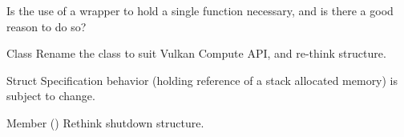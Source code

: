 \begin{DoxyRefList}
%
Is the use of a wrapper to hold a single function necessary, and is there a good reason to do so?  
\item[Class \doxylink{class_chess_1_1_renderer}{Chess\+::Renderer} ]\label{todo__todo000014}%
%
Rename the class to suit Vulkan Compute API, and re-\/think structure.  
\item[Struct \doxylink{struct_chess_1_1_renderer_specification}{Chess\+::Renderer\+Specification} ]\label{todo__todo000013}%
%
Specification behavior (holding reference of a stack allocated memory) is subject to change.  
\item[Member \doxylink{class_chess_1_1_window_a9cf7357e822303b352bd3c4dfccfe459}{Chess\+::Window\+::\texorpdfstring{$\sim$}{\string~}\+Window} ()]\label{todo__todo000015}%
%
Rethink shutdown structure. 
\end{DoxyRefList}